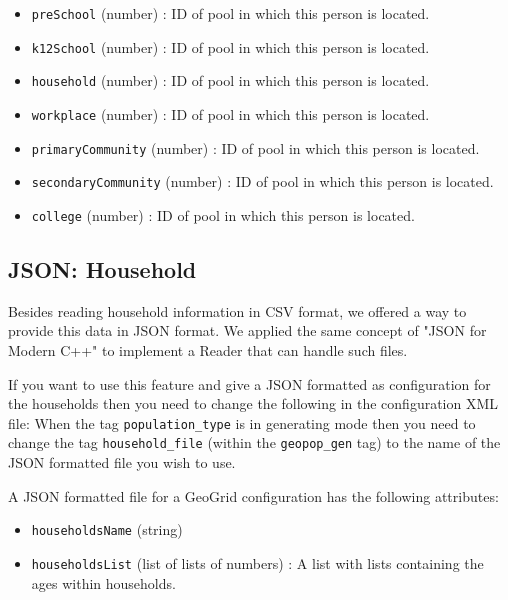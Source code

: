 \begin{itemize}
\begin{itemize}
			\item \texttt{preSchool} (number) : ID of pool in which this person is located.
			\item \texttt{k12School} (number) : ID of pool in which this person is located.
			\item \texttt{household} (number) : ID of pool in which this person is located.
			\item \texttt{workplace} (number) : ID of pool in which this person is located.
			\item \texttt{primaryCommunity} (number) : ID of pool in which this person is located.
			\item \texttt{secondaryCommunity} (number) : ID of pool in which this person is located.
			\item \texttt{college} (number) : ID of pool in which this person is located.
		\end{itemize}
\end{itemize}

\subsection{JSON: Household}
Besides reading household information in CSV format, we offered a way to provide this data in JSON format. We applied the same concept of "JSON for Modern C++" to implement a Reader that can handle such files.

If you want to use this feature and give a JSON formatted as configuration for the households then you need to change the following in the configuration XML file:
When the tag \texttt{population\_type} is in generating mode then you need to change the tag \texttt{household\_file} (within the \texttt{geopop\_gen} tag) to the name of the JSON formatted file you wish to use.

A JSON formatted file for a GeoGrid configuration has the following attributes:
\begin{itemize}
	\item \texttt{householdsName} (string)
	\item \texttt{householdsList} (list of lists of numbers) : A list with lists containing the ages within households.
\end{itemize}